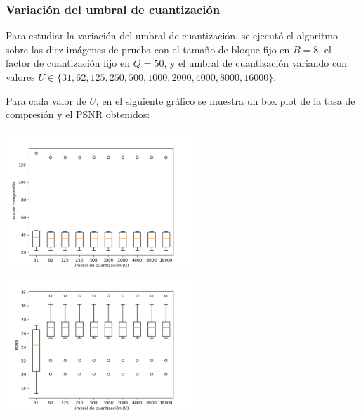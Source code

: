 \documentclass{article}
\newcommand{\set}[1]{\{#1\}}
\begin{document}
\subsubsection{Variación del umbral de cuantización}

Para estudiar la variación del umbral de cuantización, se ejecutó el
algoritmo sobre las diez imágenes de prueba con el
tamaño de bloque fijo en $B = 8$,
el factor de cuantización fijo en $Q = 50$,
y el umbral de cuantización variando con valores
$U \in \set{31, 62, 125, 250, 500, 1000, 2000, 4000, 8000, 16000}$.

Para cada valor de $U$, en el siguiente gráfico se muestra un
box plot de la tasa de compresión y el PSNR obtenidos:\\
\begin{center}
\includegraphics[width=7cm]{../imgs/output/gray_plots/u_rate.png}
\includegraphics[width=7cm]{../imgs/output/gray_plots/u_psnr.png}
\end{center}
\end{document}

